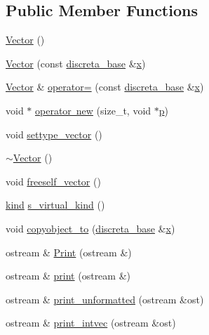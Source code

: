 \subsection*{Public Member Functions}
\begin{DoxyCompactItemize}
\item 
\mbox{\hyperlink{class_vector_a6f80c73b5f18dcf3f8e36065bdc8b9e5}{Vector}} ()
\item 
\mbox{\hyperlink{class_vector_a1d3c54bac484f186107205c9bc41a187}{Vector}} (const \mbox{\hyperlink{classdiscreta__base}{discreta\+\_\+base}} \&\mbox{\hyperlink{alphabet2_8_c_a6150e0515f7202e2fb518f7206ed97dc}{x}})
\item 
\mbox{\hyperlink{class_vector}{Vector}} \& \mbox{\hyperlink{class_vector_adbfc00f9e11251e1ebc04af9bcaca95a}{operator=}} (const \mbox{\hyperlink{classdiscreta__base}{discreta\+\_\+base}} \&\mbox{\hyperlink{alphabet2_8_c_a6150e0515f7202e2fb518f7206ed97dc}{x}})
\item 
void $\ast$ \mbox{\hyperlink{class_vector_a21793822dc89a94740a841223a1905fd}{operator new}} (size\+\_\+t, void $\ast$\mbox{\hyperlink{alphabet2_8_c_a533391314665d6bf1b5575e9a9cd8552}{p}})
\item 
void \mbox{\hyperlink{class_vector_a34e0d00b18c051f23904a8429fa6c8b4}{settype\+\_\+vector}} ()
\item 
\mbox{\hyperlink{class_vector_a2eb3c49587a4f12cade7895ccb73f6a0}{$\sim$\+Vector}} ()
\item 
void \mbox{\hyperlink{class_vector_ad55c58937ca8fb342247a2c0fb572d20}{freeself\+\_\+vector}} ()
\item 
\mbox{\hyperlink{discreta_8h_aaf25ee7e2306d78c74ec7bc48f092e81}{kind}} \mbox{\hyperlink{class_vector_a20550e70d02cbe484032c7f6b0833a0f}{s\+\_\+virtual\+\_\+kind}} ()
\item 
void \mbox{\hyperlink{class_vector_af657307f3d344c8cef5d633335a5f484}{copyobject\+\_\+to}} (\mbox{\hyperlink{classdiscreta__base}{discreta\+\_\+base}} \&\mbox{\hyperlink{alphabet2_8_c_a6150e0515f7202e2fb518f7206ed97dc}{x}})
\item 
ostream \& \mbox{\hyperlink{class_vector_ad789b6ce88fd8954c0df815f92d8f7eb}{Print}} (ostream \&)
\item 
ostream \& \mbox{\hyperlink{class_vector_a71d7e24bcfdfc69d4a2137360acb066c}{print}} (ostream \&)
\item 
ostream \& \mbox{\hyperlink{class_vector_ad42c035ccb0c95544d2a4af4abaad30c}{print\+\_\+unformatted}} (ostream \&ost)
\item 
ostream \& \mbox{\hyperlink{class_vector_af01e693b8e8a98f191b3690ef3547267}{print\+\_\+intvec}} (ostream \&ost)

\end{DoxyCompactItemize}
